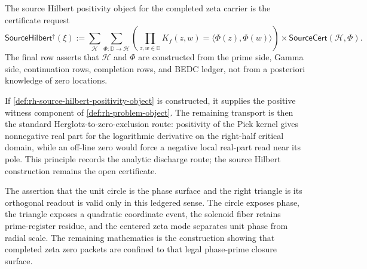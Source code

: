 \begin{definition}
\label{def:rh-source-hilbert-positivity-object}
The source Hilbert positivity object for the completed zeta carrier is
the certificate request
$$
\mathsf{SourceHilbert}^{\uparrow}(\xi)
:=
\sum_{\mathcal H}
\sum_{\Phi:\mathbb D\to\mathcal H}
\left(
\prod_{z,w\in\mathbb D}
K_f(z,w)=\langle\Phi(z),\Phi(w)\rangle
\right)
\times
\mathsf{SourceCert}(\mathcal H,\Phi).
$$
The final row asserts that $\mathcal H$ and $\Phi$ are constructed from
the prime side, Gamma side, continuation rows, completion rows, and BEDC
ledger, not from a posteriori knowledge of zero locations.
\end{definition}

\begin{principle}
\label{prin:rh-source-hilbert-positivity-remaining-discharge}
If \autoref{def:rh-source-hilbert-positivity-object} is constructed, it
supplies the positive witness component of
\autoref{def:rh-problem-object}. The remaining transport is then the
standard Herglotz-to-zero-exclusion route: positivity of the Pick kernel
gives nonnegative real part for the logarithmic derivative on the
right-half critical domain, while an off-line zero would force a negative
local real-part read near its pole. This principle records the analytic
discharge route; the source Hilbert construction remains the open
certificate.
\end{principle}

\begin{principle}
\label{prin:rh-phase-triangle-prime-register-status}
The assertion that the unit circle is the phase surface and the right
triangle is its orthogonal readout is valid only in this ledgered sense.
The circle exposes phase, the triangle exposes a quadratic coordinate
event, the solenoid fiber retains prime-register residue, and the
centered zeta mode separates unit phase from radial scale. The remaining
mathematics is the construction showing that completed zeta zero packets
are confined to that legal phase-prime closure surface.
\end{principle}
